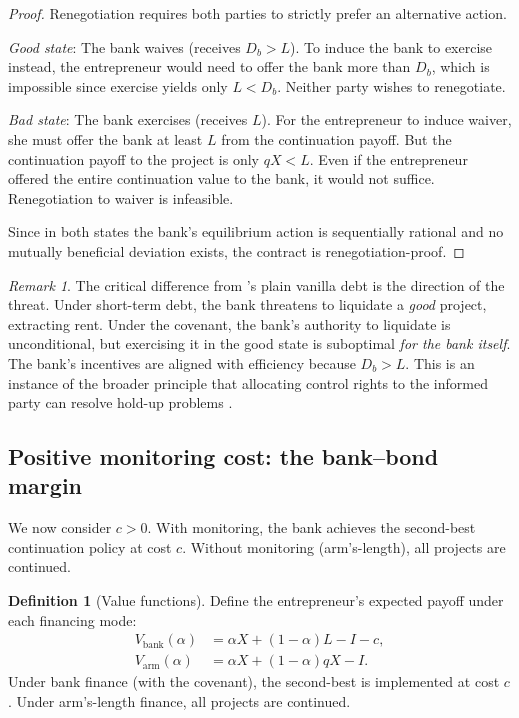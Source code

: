 \documentclass[12pt,a4paper]{article}
\theoremstyle{plain}
\theoremstyle{definition}
\newtheorem{definition}[theorem]{Definition}
\theoremstyle{remark}
\newtheorem{remark}[theorem]{Remark}
\begin{document}
\begin{proof}
Renegotiation requires both parties to strictly prefer an alternative action.

\textit{Good state}: The bank waives (receives $D_b > L$). To induce the bank to exercise instead, the entrepreneur would need to offer the bank more than $D_b$, which is impossible since exercise yields only $L < D_b$. Neither party wishes to renegotiate.

\textit{Bad state}: The bank exercises (receives $L$). For the entrepreneur to induce waiver, she must offer the bank at least $L$ from the continuation payoff. But the continuation payoff to the project is only $qX < L$. Even if the entrepreneur offered the entire continuation value to the bank, it would not suffice. Renegotiation to waiver is infeasible.

Since in both states the bank's equilibrium action is sequentially rational and no mutually beneficial deviation exists, the contract is renegotiation-proof.
\end{proof}

\begin{remark}\label{r:key}
The critical difference from \citeauthor{rajan1992}'s plain vanilla debt is the direction of the threat. Under short-term debt, the bank threatens to liquidate a \emph{good} project, extracting rent. Under the covenant, the bank's authority to liquidate is unconditional, but exercising it in the good state is suboptimal \emph{for the bank itself}. The bank's incentives are aligned with efficiency because $D_b > L$. This is an instance of the broader principle that allocating control rights to the informed party can resolve hold-up problems \citep{aghionbolton1992}.
\end{remark}

\subsection{Positive monitoring cost: the bank--bond margin}

We now consider $c > 0$. With monitoring, the bank achieves the second-best continuation policy at cost $c$. Without monitoring (arm's-length), all projects are continued.

\begin{definition}[Value functions]\label{d:values}
Define the entrepreneur's expected payoff under each financing mode:
\begin{align}
V_{\text{bank}}(\alpha) &= \alpha X + (1-\alpha)L - I - c, \label{eq:vbank} \\
V_{\text{arm}}(\alpha) &= \alpha X + (1-\alpha)qX - I. \label{eq:varm}
\end{align}
Under bank finance (with the covenant), the second-best is implemented at cost $c$. Under arm's-length finance, all projects are continued.
\end{definition}
\end{document}
